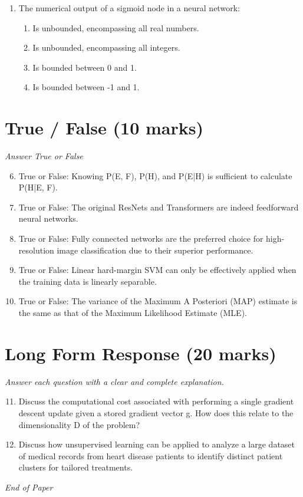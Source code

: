 \documentclass[12pt]{article}
\begin{document}
\begin{enumerate}[label=\arabic*.]
\begin{enumerate}[label=(\alph*)]
    \item False, True
\end{enumerate}
\item The numerical output of a sigmoid node in a neural network:
\begin{enumerate}[label=(\alph*)]
    \item Is unbounded, encompassing all real numbers.
    \item Is unbounded, encompassing all integers.
    \item Is bounded between 0 and 1.
    \item Is bounded between -1 and 1.
\end{enumerate}
\end{enumerate}

\section*{True / False (10 marks)}
\textit{Answer True or False}
\begin{enumerate}[label=\arabic*.]
\setcounter{enumi}{5}
\item True or False: Knowing P(E, F), P(H), and P(E|H) is sufficient to calculate P(H|E, F).
\item True or False: The original ResNets and Transformers are indeed feedforward neural networks.
\item True or False: Fully connected networks are the preferred choice for high-resolution image classification due to their superior performance.
\item True or False: Linear hard-margin SVM can only be effectively applied when the training data is linearly separable.
\item True or False: The variance of the Maximum A Posteriori (MAP) estimate is the same as that of the Maximum Likelihood Estimate (MLE).
\end{enumerate}

\section*{Long Form Response (20 marks)}
\textit{Answer each question with a clear and complete explanation.}
\begin{enumerate}[label=\arabic*.]
\setcounter{enumi}{10}
\item Discuss the computational cost associated with performing a single gradient descent update given a stored gradient vector g. How does this relate to the dimensionality D of the problem?
\item Discuss how unsupervised learning can be applied to analyze a large dataset of medical records from heart disease patients to identify distinct patient clusters for tailored treatments.
\end{enumerate}

\vfill
\noindent\textit{End of Paper}
\end{document}
